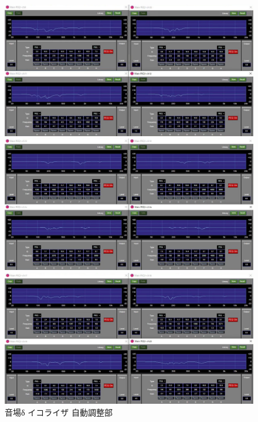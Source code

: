 \documentclass[11pt,a4j]{jreport}
\begin{document}
\begin{figure}[H]
  \begin{minipage}[b]{.5\linewidth}
    \centering
    \includegraphics[width=.9\linewidth]{images/experimentField/afcParameters/04delta/03autoEQ3.jpg}
  \end{minipage}%
  \begin{minipage}[b]{.5\linewidth}
    \centering
    \includegraphics[width=.9\linewidth]{images/experimentField/afcParameters/04delta/03autoEQ4.jpg}
  \end{minipage}

  \begin{minipage}[b]{1\linewidth}
    \centering
    \includegraphics[width=.45\linewidth]{images/experimentField/afcParameters/04delta/03autoEQ5.jpg}
  \end{minipage}

  \centering
  \caption{音場δ イコライザ 自動調整部}
  \label{fig:deltaイコライザ自動調整部}
\end{figure}
\newpage
\end{document}
